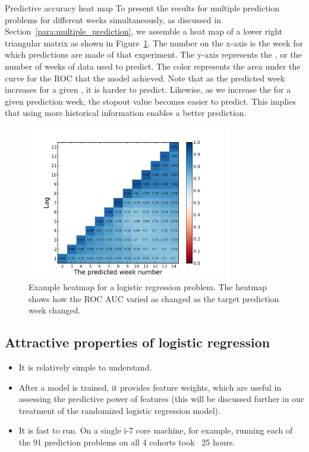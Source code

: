 \begin{paragraph}
{Predictive accuracy heat map} To present the results for multiple prediction problems for different weeks simultaneously, as discussed in Section~\ref{para:multiple_prediction},  we assemble a heat map of a lower right triangular matrix as shown in Figure~\ref{fig:logistic_regression_heatmap_no_collab2}. The number on the x-axis is the week for which predictions are made of that experiment. The y-axis represents the \lag, or the number of weeks of data used to predict. The color represents the area under the curve for the ROC that the model achieved. Note that as the predicted week increases for a given \lag, it is harder to predict. Likewise, as we increase the \lag for a given prediction week, the stopout value becomes easier to predict. This implies that using more historical information enables a better prediction.
\end{paragraph}

\begin{figure}[!ht]
  \caption{Example heatmap for a logistic regression problem. The heatmap shows how the ROC AUC varied as \lag changed as the target prediction week changed.}\label{fig:logistic_regression_heatmap_no_collab2}
  \centering
    \includegraphics[width=0.8\textwidth]{figures/logreg/no_collab.png}
\end{figure}

\subsection{Attractive properties of logistic regression} 
\begin{itemize}
\item It is relatively simple to understand. 
\item After a model is trained, it provides feature weights, which are useful in assessing the predictive power of features (this will be discussed further in our treatment of the randomized logistic regression model). 
\item It is fast to run. On a single i-7 core machine, for example, running each of the 91 prediction problems on all 4 cohorts took ~25 hours.
\end{itemize}

